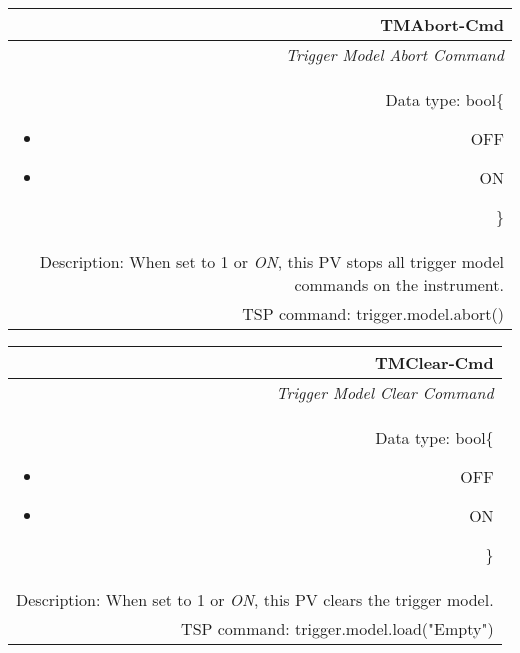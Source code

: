 \documentclass[openany]{article}
\begin{document}
		\begin{tabular}{N}
			\hline
			\bfseries TMAbort-Cmd\label{pv:tmabort-cmd} \\ \hline
			\emph{Trigger Model Abort Command} \\
			Data type: bool\{\begin{itemize}[noitemsep]
				\small
				\item[] OFF
				\item[] ON
			\end{itemize}\} \\
			Description: When set to 1 or \emph{ON}, this PV stops all trigger model commands on the instrument. \\
			TSP command: trigger.model.abort()
		\end{tabular}

		\begin{tabular}{N}
			\hline
			\bfseries TMClear-Cmd\label{pv:tmclear-cmd} \\ \hline
			\emph{Trigger Model Clear Command} \\
			Data type: bool\{\begin{itemize}[noitemsep]
				\small
				\item[] OFF
				\item[] ON
			\end{itemize}\} \\
			Description: When set to 1 or \emph{ON}, this PV clears the trigger model. \\
			TSP command: trigger.model.load("Empty")
		\end{tabular}
\end{document}
